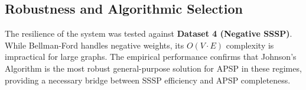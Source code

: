 \subsection{Robustness and Algorithmic Selection}

The resilience of the system was tested against \textbf{Dataset 4 (Negative SSSP)}. While Bellman-Ford handles negative weights, its $O(V \cdot E)$ complexity is impractical for large graphs. The empirical performance confirms that Johnson's Algorithm is the most robust general-purpose solution for APSP in these regimes, providing a necessary bridge between SSSP efficiency and APSP completeness.



